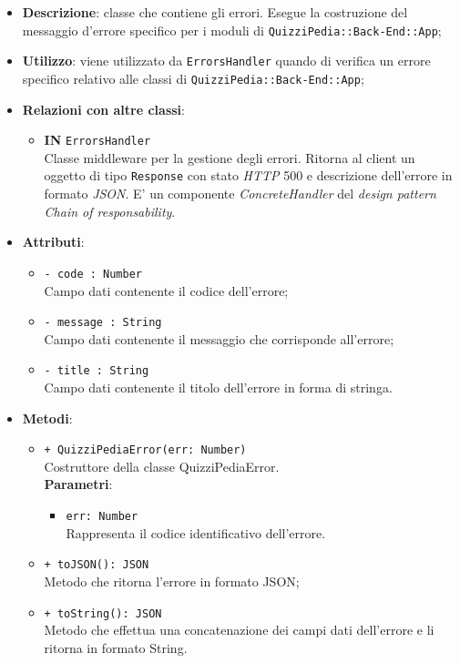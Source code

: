 	\begin{itemize}
		\item \textbf{Descrizione}:
		classe che contiene gli errori. Esegue la costruzione del messaggio d'errore specifico per i moduli di \texttt{QuizziPedia::Back-End::App};
		\item \textbf{Utilizzo}:
		viene utilizzato da \texttt{ErrorsHandler} quando di verifica un errore specifico relativo alle classi di \texttt{QuizziPedia::Back-End::App};
		\item \textbf{Relazioni con altre classi}:
			 \begin{itemize}
			 	\item \textbf{IN} \texttt{ErrorsHandler} \\
			 	Classe middleware per la gestione degli errori. Ritorna al client un oggetto di tipo \texttt{Response} con stato \textit{HTTP} 500 e descrizione dell'errore in formato \textit{JSON}. E' un componente \textit{ConcreteHandler} del \textit{design pattern} \textit{Chain of responsability}.
			 \end{itemize}
		\item \textbf{Attributi}:
			 \begin{itemize}
			 	\item \texttt{- code : Number}\\
			 	Campo dati contenente il codice dell'errore;
			 	\item \texttt{- message : String}\\
			 	Campo dati contenente il messaggio che corrisponde all'errore;
			 	\item \texttt{- title : String}\\
			 	Campo dati contenente il titolo dell'errore in forma di stringa.
			 \end{itemize}
		\item \textbf{Metodi}:
			\begin{itemize}
				\item \texttt{+ QuizziPediaError(err: Number)}\\
				Costruttore della classe QuizziPediaError.\\
				\textbf{Parametri}:
				\begin{itemize}
					\item \texttt{err: Number}\\
					Rappresenta il codice identificativo dell'errore.
				\end{itemize}
				\item \texttt{+ toJSON(): JSON}\\
				Metodo che ritorna l'errore in formato JSON;
				\item \texttt{+ toString(): JSON}\\
				Metodo che effettua una concatenazione dei campi dati dell'errore e li ritorna in formato String.
			\end{itemize}
	\end{itemize}
